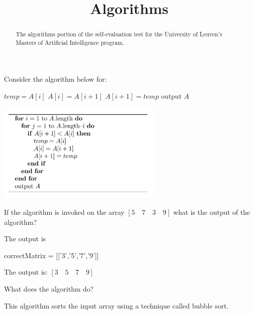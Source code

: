 \documentclass{ximera}
\title{Algorithms}
\begin{document}
\begin{abstract}
The algorithms portion of the self-evaluation test for the University
of Leuven's Masters of Artificial Intelligence program.
\end{abstract}
\maketitle

\begin{question}
Consider the algorithm below for: 
\begin{algorithm}%
\begin{algorithmic}
  \STATE $temp = A[i]$
  \STATE $A[i] = A[i+1]$
  \STATE $A[i+1] = temp$
  \ENDIF
  \ENDFOR
  \ENDFOR
  \STATE output $A$
\end{algorithmic}
\end{algorithm}

\begin{image}
\includegraphics[width=0.6\textwidth]{algo.png}
\end{image}


If the algorithm is invoked on the array $[ 5\quad 7\quad 3\quad 9]$ what is the output of the algorithm?
\begin{solution}
The output is 
\begin{matrix-answer}[name=M]
    correctMatrix = [['3','5','7','9']]
\end{matrix-answer}
\end{solution}

The output is:
$ [3 \quad 5 \quad 7 \quad 9] $

What does the algorithm do? 
\begin{free-response}
\end{free-response}
This algorithm sorts the input array using a technique called bubble sort.


\end{question}
\end{document}
